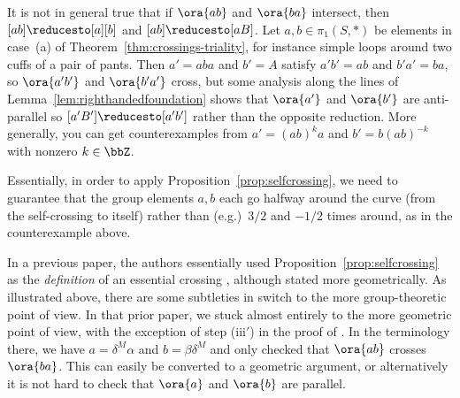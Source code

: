 It is not in general true that if $\ora{ab}$ and $\ora{ba}$ intersect,
then $[ab] \reducesto [a][b]$ and $[ab] \reducesto [aB]$. Let
$a,b \in \pi_1(S,*)$ be elements in case~(a) of
Theorem~\ref{thm:crossings-triality}, for instance simple loops around
two cuffs of a pair of pants. Then $a' = aba$ and $b' = A$ satisfy
$a'b' = ab$ and $b'a' = ba$, so $\ora{a'b'}$ and $\ora{b'a'}$ cross,
 but some analysis along the lines of
Lemma~\ref{lem:righthandedfoundation} shows that $\ora{a'}$ and
$\ora{b'}$ are anti-parallel so $[a'B'] \reducesto [a'b']$ rather than
the opposite reduction. More generally, you can get counterexamples
from $a' = (ab)^k a$ and $b' = b (ab)^{-k}$ with nonzero $k \in \bbZ$.

Essentially, in order to apply Proposition~\ref{prop:selfcrossing}, we
need to guarantee that the group elements $a,b$ each go halfway around
the curve (from the self-crossing to itself) rather than (e.g.)\ $3/2$
and $-1/2$ times around, as in the counterexample above.

In a previous paper, the authors essentially used
Proposition~\ref{prop:selfcrossing} as the \emph{definition} of an
essential crossing \cite[Def.\ 2.16]{MGT21:Smoothings}, although
stated more geometrically. As illustrated above, there are some
subtleties in switch to the more group-theoretic point of view. In
that prior paper, we stuck almost entirely to the more geometric point
of view, with the exception of step (iii$'$) in the proof of
\cite[Lemma 8.1(b)]{MGT21:Smoothings}. In the terminology there, we
have $a = \delta^M \alpha$ and $b = \beta \delta^M$ and only checked
that $\ora{ab}$ crosses $\ora{ba}$. This can easily be converted to a
geometric argument, or alternatively it is not hard to check that
$\ora{a}$ and $\ora{b}$ are parallel.


